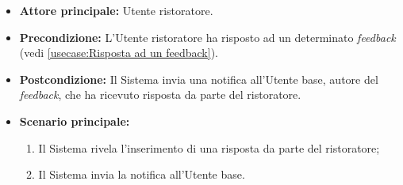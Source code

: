 \label{usecase:Notifica risposta feedback}
\begin{itemize}
	\item \textbf{Attore principale:} Utente ristoratore.
	
	\item \textbf{Precondizione:} L'Utente ristoratore ha risposto ad un determinato \textit{feedback} (vedi \autoref{usecase:Risposta ad un feedback}).

    
	\item \textbf{Postcondizione:} Il Sistema invia una notifica all'Utente base, autore del \textit{feedback}, che ha ricevuto risposta da parte del ristoratore.
     
	\item \textbf{Scenario principale:}
	      \begin{enumerate}
                \item Il Sistema rivela l'inserimento di una risposta da parte del ristoratore;
                \item Il Sistema invia la notifica all'Utente base.
	      \end{enumerate}
\end{itemize}